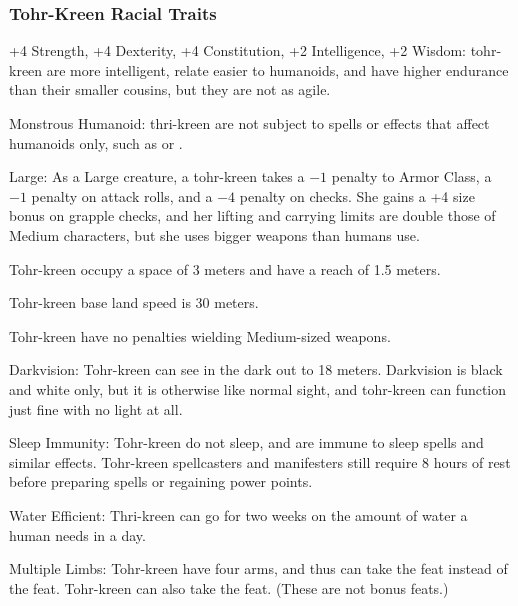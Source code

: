 
\subsubsection{Tohr-Kreen Racial Traits}
\begin{itemize*}
    \item +4 Strength, +4 Dexterity, +4 Constitution, +2 Intelligence, +2 Wisdom: tohr-kreen are more intelligent, relate easier to humanoids, and have higher endurance than their smaller cousins, but they are not as agile.
    \item Monstrous Humanoid: thri-kreen are not subject to spells or effects that affect humanoids only, such as  or .
    \item Large: As a Large creature, a tohr-kreen takes a $-1$ penalty to Armor Class, a $-1$ penalty on attack rolls, and a $-4$ penalty on  checks. She gains a +4 size bonus on grapple checks, and her lifting and carrying limits are double those of Medium characters, but she uses bigger weapons than humans use.
    \item Tohr-kreen occupy a space of 3 meters and have a reach of 1.5 meters.
    \item Tohr-kreen base land speed is 30 meters.
    \item Tohr-kreen have no penalties wielding Medium-sized weapons.

    \item Darkvision: Tohr-kreen can see in the dark out to 18 meters. Darkvision is black and white only, but it is otherwise like normal sight, and tohr-kreen can function just fine with no light at all.
    \item Sleep Immunity: Tohr-kreen do not sleep, and are immune to sleep spells and similar effects. Tohr-kreen spellcasters and manifesters still require 8 hours of rest before preparing spells or regaining power points.
    \item Water Efficient: Thri-kreen can go for two weeks on the amount of water a human needs in a day.
    \item Multiple Limbs: Tohr-kreen have four arms, and thus can take the  feat instead of the  feat. Tohr-kreen can also take the  feat. (These are not bonus feats.)


\end{itemize*}
